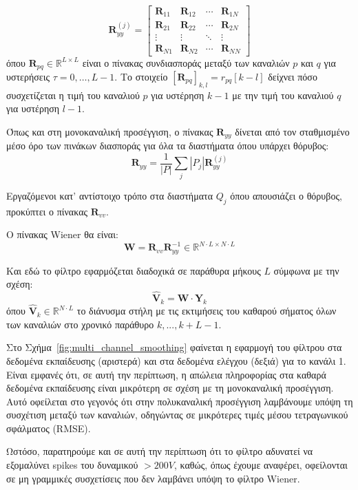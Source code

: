 \documentclass[a4paper,12pt]{article}
\begin{document}
\[
\mathbf{R}_{yy}^{(j)} =
\begin{bmatrix}
    \mathbf{R}_{11} & \mathbf{R}_{12} & \cdots & \mathbf{R}_{1N} \\
    \mathbf{R}_{21} & \mathbf{R}_{22} & \cdots & \mathbf{R}_{2N} \\
    \vdots & \vdots & \ddots & \vdots \\
    \mathbf{R}_{N1} & \mathbf{R}_{N2} & \cdots & \mathbf{R}_{NN}
\end{bmatrix}
\]
όπου $\mathbf{R}_{pq} \in \mathbb{R}^{L \times L}$ είναι ο πίνακας συνδιασποράς μεταξύ των καναλιών $p$ και 
$q$ για υστερήσεις $\tau = 0, \ldots, L - 1$. Το στοιχείο $[\mathbf{R}_{pq}]_{k, l} = r_{pq}[k - l]$ δείχνει
πόσο συσχετίζεται η τιμή του καναλιού $p$ για υστέρηση $k - 1$ με την τιμή του καναλιού $q$ για υστέρηση 
$l - 1$.

Όπως και στη μονοκαναλική προσέγγιση, ο πίνακας $\mathbf{R}_{yy}$ δίνεται από τον σταθμισμένο μέσο όρο  
των πινάκων διασποράς για όλα τα διαστήματα όπου υπάρχει θόρυβος:
\[
\mathbf{R}_{yy} = \frac{1}{|P|} \sum_j |P_j| \mathbf{R}_{yy}^{(j)}
\]

Εργαζόμενοι κατ' αντίστοιχο τρόπο στα διαστήματα $Q_j$ όπου απουσιάζει ο θόρυβος, προκύπτει ο πίνακας 
$\mathbf{R}_{vv}$.

Ο πίνακας Wiener θα είναι:
\[
\mathbf{W} = \mathbf{R}_{vv}\mathbf{R}_{yy}^{-1} \in \mathbb{R}^{N \cdot L \times N \cdot L}
\]

Και εδώ το φίλτρο εφαρμόζεται διαδοχικά σε παράθυρα μήκους $L$ σύμφωνα με την σχέση:
\[
\hat{\mathbf{V}}_k = \mathbf{W} \cdot \mathbf{Y}_k
\] 
όπου $\hat{\mathbf{V}}_k \in \mathbb{R}^{N \cdot L}$ το διάνυσμα στήλη με τις εκτιμήσεις του καθαρού 
σήματος όλων των καναλιών στο χρονικό παράθυρο $k,...,k+L-1$.

Στο Σχήμα~\ref{fig:multi_channel_smoothing} φαίνεται η εφαρμογή του φίλτρου στα δεδομένα εκπαίδευσης 
(αριστερά) και στα δεδομένα ελέγχου (δεξιά) για το κανάλι 1. Είναι εμφανές ότι, σε αυτή την περίπτωση, 
η απώλεια πληροφορίας στα καθαρά δεδομένα εκπαίδευσης είναι μικρότερη σε σχέση με τη μονοκαναλική προσέγγιση.  
Αυτό οφείλεται στο γεγονός ότι στην πολυκαναλική προσέγγιση λαμβάνουμε υπόψη τη συσχέτιση μεταξύ των καναλιών,  
οδηγώντας σε μικρότερες τιμές μέσου τετραγωνικού σφάλματος (RMSE).

Ωστόσο, παρατηρούμε και σε αυτή την περίπτωση ότι το φίλτρο αδυνατεί να εξομαλύνει 
spikes του δυναμικού $ > 200 V$, καθώς, όπως έχουμε αναφέρει,
οφείλονται σε μη γραμμικές συσχετίσεις που δεν λαμβάνει υπόψη το φίλτρο 
Wiener.
\end{document}
